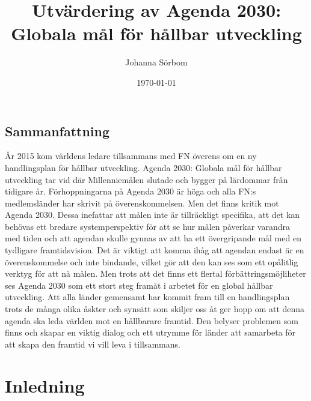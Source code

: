 \documentclass{report}
\title{Utvärdering av Agenda 2030: Globala mål för hållbar utveckling}
\date{\today}
\author{Johanna Sörbom}
\begin{document}
\maketitle

\newpage
\begin{titlepage}
\section*{Sammanfattning}
År 2015 kom världens ledare tillsammans med FN överens om en ny handlingsplan för hållbar utveckling. Agenda 2030: Globala mål för hållbar utveckling tar vid där Millenniemålen slutade och bygger på lärdommar från tidigare år. Förhoppningarna på Agenda 2030 är höga och alla FN:s medlemsländer har skrivit på överenskommelsen. Men det finns kritik mot Agenda 2030. Dessa inefattar att målen inte är tillräckligt specifika, att det kan behövas ett bredare systemperspektiv för att se hur målen påverkar varandra med tiden och att agendan skulle gynnas av att ha ett övergripande mål med en tydligare framtidsvision. Det är viktigt att komma ihåg att agendan endast är en överenskommelse och inte bindande, vilket gör att den kan ses som ett opålitlig verktyg för att nå målen. Men trots att det finns ett flertal förbättringsmöjliheter ses Agenda 2030 som ett stort steg framåt i arbetet för en global hållbar utveckling. Att alla länder gemensamt har kommit fram till en handlingsplan trots de många olika åskter och synsätt som skiljer oss åt ger hopp om att denna agenda ska leda världen mot en hållbarare framtid. Den belyser problemen som finns och skapar en viktig dialog och ett utrymme för länder att samarbeta för att skapa den framtid vi vill leva i tillsammans. 

\newpage
\tableofcontents
\end{titlepage}
\newpage
{}
\section{Inledning}
\end{document}
